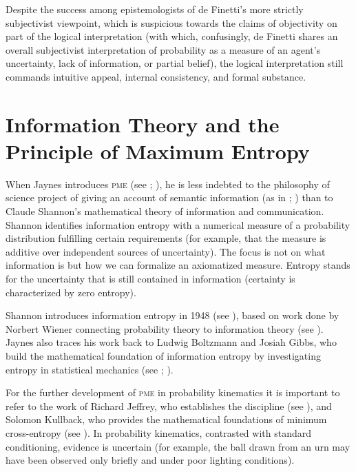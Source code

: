 \documentclass[phd,12pt,oneside]{ubcthesis}
\begin{document}
Despite the success among epistemologists of de Finetti's more
strictly subjectivist viewpoint, which is suspicious towards the
claims of objectivity on part of the logical interpretation (with
which, confusingly, de Finetti shares an overall subjectivist
interpretation of probability as a measure of an agent's uncertainty,
lack of information, or partial belief), the logical interpretation
still commands intuitive appeal, internal consistency, and formal
substance.

\section{Information Theory and the Principle of Maximum Entropy}
\label{sec:ieghosha}

When Jaynes introduces \textsc{pme} (see ;
), he is less indebted to the philosophy of
science project of giving an account of semantic information (as in
; ) than
to Claude Shannon's mathematical theory of information and
communication. Shannon identifies information entropy with a numerical
measure of a probability distribution fulfilling certain requirements
(for example, that the measure is additive over independent sources of
uncertainty). The focus is not on what information is but how we can
formalize an axiomatized measure. Entropy stands for the uncertainty
that is still contained in information (certainty is characterized by
zero entropy).

Shannon introduces information entropy in 1948 (see
), based on work done by Norbert Wiener
connecting probability theory to information theory (see
). Jaynes also traces his work back to Ludwig
Boltzmann and Josiah Gibbs, who build the mathematical foundation of
information entropy by investigating entropy in statistical mechanics
(see ; ).

For the further development of \textsc{pme} in probability
kinematics it is important to refer to the work of Richard Jeffrey,
who establishes the discipline (see ), and
Solomon Kullback, who provides the mathematical foundations of minimum
cross-entropy (see ). In probability
kinematics, contrasted with standard conditioning, evidence is
uncertain (for example, the ball drawn from an urn may have been
observed only briefly and under poor lighting conditions).
\end{document}
